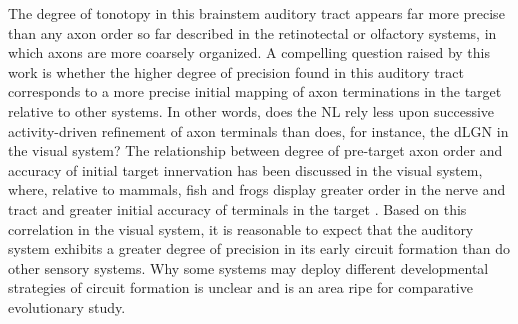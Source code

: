 The degree of tonotopy in this brainstem auditory tract appears far more precise than any axon order so far described in the retinotectal or olfactory systems, in which axons are more coarsely organized. 
A compelling question raised by this work is whether the higher degree of precision found in this auditory tract corresponds to a more precise initial mapping of axon terminations in the target relative to other systems. 
In other words, does the NL rely less upon successive activity-driven refinement of axon terminals than does, for instance, the dLGN in the visual system? 
The relationship between degree of pre-target axon order and accuracy of initial target innervation has been discussed in the visual system, where, relative to mammals, fish and frogs display greater order in the nerve and tract and greater initial accuracy of terminals in the target \cite{simon1991relationship}. 
Based on this correlation in the visual system, it is reasonable to expect that the auditory system exhibits a greater degree of precision in its early circuit formation than do other sensory systems. 
Why some systems may deploy different developmental strategies of circuit formation is unclear and is an area ripe for comparative evolutionary study. 